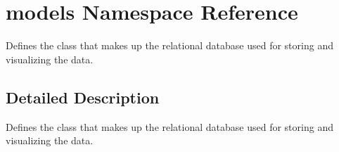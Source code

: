 \hypertarget{namespacemodels}{\section{models Namespace Reference}
\label{namespacemodels}
}


Defines the class that makes up the relational database used for storing and visualizing the data.  




\subsection{Detailed Description}
Defines the class that makes up the relational database used for storing and visualizing the data. 
